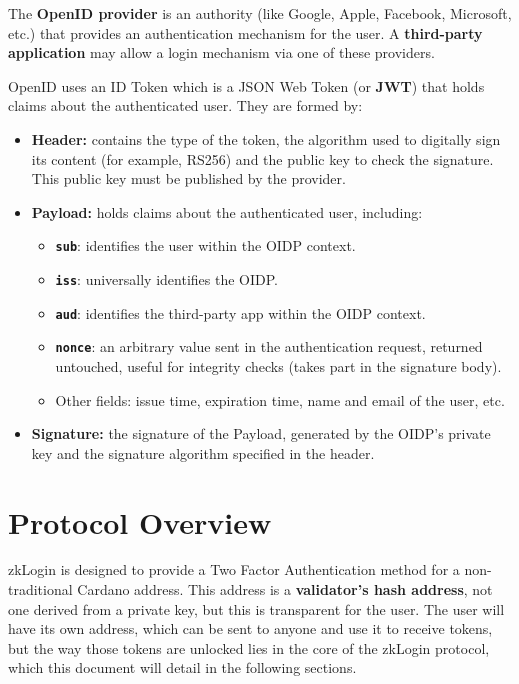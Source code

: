 \documentclass{article}
\begin{document}
The \textbf{OpenID provider} is an authority (like Google, Apple, Facebook, Microsoft, etc.) that provides an authentication mechanism for the user. A \textbf{third-party application} may allow a login mechanism via one of these providers.

OpenID uses an ID Token which is a JSON Web Token (or \textbf{JWT}) that holds claims about the authenticated user. They are formed by:
\begin{itemize}
    \item \textbf{Header:} contains the type of the token, the algorithm used to digitally sign its content (for example, RS256) and the public key to check the signature. This public key must be published by the provider.
    \item \textbf{Payload:} holds claims about the authenticated user, including:
    \begin{itemize}
        \item \textbf{\texttt{sub}}: identifies the user within the OIDP context.
        \item \textbf{\texttt{iss}}: universally identifies the OIDP.
        \item \textbf{\texttt{aud}}: identifies the third-party app within the OIDP context.
        \item \textbf{\texttt{nonce}}: an arbitrary value sent in the authentication request, returned untouched, useful for integrity checks (takes part in the signature body).
        \item Other fields: issue time, expiration time, name and email of the user, etc.
    \end{itemize}
    \item \textbf{Signature:} the signature of the Payload, generated by the OIDP's private key and the signature algorithm specified in the header.
\end{itemize}

\section{Protocol Overview}

zkLogin is designed to provide a Two Factor Authentication method for a non-traditional Cardano address.
This address is a \textbf{validator's hash address}, not one derived from a private key, but this is transparent for the user.
The user will have its own address, which can be sent to anyone and use it to receive tokens, but the way those tokens are unlocked lies in the core of the zkLogin protocol, which this document will detail in the following sections.
\end{document}
